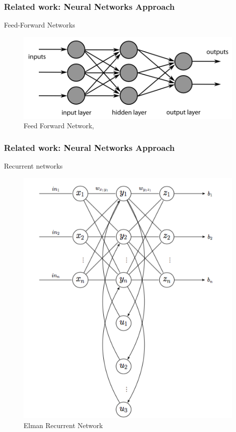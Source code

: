 \documentclass{beamer}
\begin{document}

	\begin{frame}
		\frametitle{Related work: Neural Networks Approach}
		\centering
		Feed-Forward Networks
		
		\begin{figure}[h!]
			\begin{minipage}[H]{\linewidth}
				\centering
				\includegraphics[width=\linewidth]{presentation_images/9}
				\caption{Feed Forward Network, \cite{kim2012zmp}}
			\end{minipage}
		\end{figure}
	\end{frame}


	\begin{frame}
		\frametitle{Related work: Neural Networks Approach}
		\centering
		Recurrent networks 
		
		\begin{figure}[h!]
			\begin{minipage}[H]{\linewidth}
				\centering
				\includegraphics[width=0.5\linewidth]{presentation_images/10}
				\caption{Elman Recurrent Network}
			\end{minipage}
		\end{figure}
	\end{frame}
	
\end{document}
